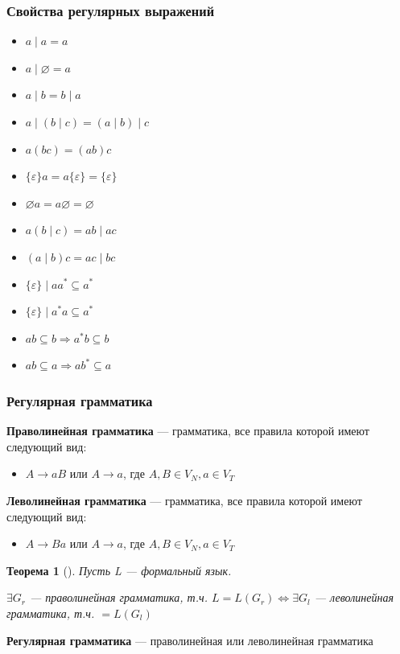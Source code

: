\documentclass{beamer}
\newtheorem{rutheorem}{Теорема}
\begin{document}
\begin{frame}
  \transwipe[direction=90]
  \frametitle{Свойства регулярных выражений}
  \begin{itemize}
    \item $a \mid a = a$
    \item $a \mid \varnothing = a$
    \item $a \mid b = b \mid a$
    \item $a \mid (b \mid c) = (a \mid b) \mid c$
    \item $a(bc) = (ab)c$
    \item $\{\varepsilon \} a = a \{ \varepsilon \} = \{ \varepsilon \} $
    \item $\varnothing a = a \varnothing = \varnothing$
    \item $a (b\mid c) = ab \mid ac$
    \item $(a \mid b) c = ac \mid bc $
    \item $\{\varepsilon \} \mid aa^* \subseteq a^*$
    \item $\{\varepsilon \} \mid a^*a \subseteq a^*$
    \item $ab \subseteq b \Rightarrow a^* b \subseteq b$
    \item $ab \subseteq a \Rightarrow a b^* \subseteq a$
        
  \end{itemize}
\end{frame}



\begin{frame}[fragile]
  \transwipe[direction=90]
  \frametitle{Регулярная грамматика}
  \textbf{Праволинейная грамматика} --- грамматика, все правила которой имеют следующий вид:
  \begin{itemize}
    \item $A \to a B$ или $A \to a$, где $A, B \in V_N, a \in V_T$
  \end{itemize}


  \textbf{Леволинейная грамматика} --- грамматика, все правила которой имеют следующий вид:
  \begin{itemize}
    \item $A \to B a$ или $A \to a$, где $A, B \in V_N, a \in V_T$
  \end{itemize}

\pause 

  \begin{rutheorem}[]
    Пусть L --- формальный язык. 

    $\exists G_r$ --- праволинейная грамматика, т.ч. $L = L(G_r) \Leftrightarrow \exists G_l$ --- леволинейная грамматика, т.ч. $ = L(G_l) $
  \end{rutheorem}
\pause
  \textbf{Регулярная грамматика} --- праволинейная или леволинейная грамматика
\end{frame}
\end{document}
